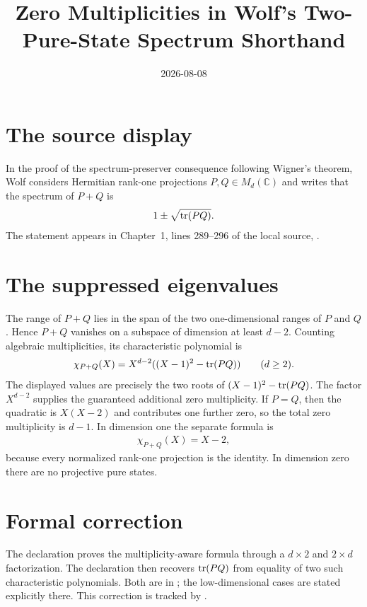 \documentclass{article}
\title{Zero Multiplicities in Wolf's Two-Pure-State Spectrum Shorthand}
\author{}
\date{2026-08-08}
\begin{document}
\maketitle
{}

\section{The source display}

In the proof of the spectrum-preserver consequence following Wigner's theorem,
Wolf considers Hermitian rank-one projections $P,Q\in M_d(\mathbb C)$ and
writes that the spectrum of $P+Q$ is
\begin{align}
  1\pm\sqrt{\operatorname{tr}(PQ)}.
\end{align}
The statement appears in Chapter~1, lines 289--296 of the local source,
.

\section{The suppressed eigenvalues}

The range of $P+Q$ lies in the span of the two one-dimensional ranges of $P$
and $Q$. Hence $P+Q$ vanishes on a subspace of dimension at least $d-2$.
Counting algebraic multiplicities, its characteristic polynomial is
\begin{align}
  \chi_{P+Q}(X)
  =X^{d-2}((X-1)^2-\operatorname{tr}(PQ))
  \qquad(d\geq2).
\end{align}
The displayed values are precisely the two roots of
$(X-1)^2-\operatorname{tr}(PQ)$. The factor $X^{d-2}$ supplies the guaranteed additional
zero multiplicity. If $P=Q$, then the quadratic is $X(X-2)$ and contributes
one further zero, so the total zero multiplicity is $d-1$. In dimension one
the separate formula is
\begin{align}
  \chi_{P+Q}(X)=X-2,
\end{align}
because every normalized rank-one projection is the identity. In dimension
zero there are no projective pure states.

\section{Formal correction}

The declaration
 proves the
multiplicity-aware formula through a $d\times2$ and $2\times d$ factorization.
The declaration
then recovers $\operatorname{tr}(PQ)$ from equality of two such characteristic polynomials.
Both are in
; the low-dimensional cases
are stated explicitly there. This correction is tracked by .
\end{document}
